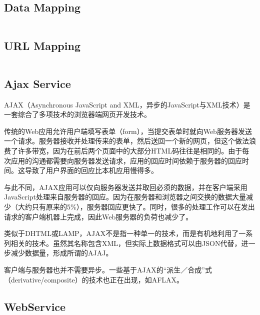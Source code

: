 \begin{lstlisting}[language=PHP]

\end{lstlisting}



\subsection{Data Mapping}


\begin{lstlisting}[language=PHP]

\end{lstlisting}



\subsection{URL Mapping}


\begin{lstlisting}[language=PHP]

\end{lstlisting}


\subsection{Ajax Service}


AJAX（Asynchronous JavaScript and XML，异步的JavaScript与XML技术）是一套综合了多项技术的浏览器端网页开发技术。

传统的Web应用允许用户端填写表单（form），当提交表单时就向Web服务器发送一个请求。服务器接收并处理传来的表单，然后送回一个新的网页，但这个做法浪费了许多带宽，因为在前后两个页面中的大部分HTML码往往是相同的。由于每次应用的沟通都需要向服务器发送请求，应用的回应时间依赖于服务器的回应时间。这导致了用户界面的回应比本机应用慢得多。

与此不同，AJAX应用可以仅向服务器发送并取回必须的数据，并在客户端采用JavaScript处理来自服务器的回应。因为在服务器和浏览器之间交换的数据大量减少（大约只有原来的5\%），服务器回应更快了。同时，很多的处理工作可以在发出请求的客户端机器上完成，因此Web服务器的负荷也减少了。

类似于DHTML或LAMP，AJAX不是指一种单一的技术，而是有机地利用了一系列相关的技术。虽然其名称包含XML，但实际上数据格式可以由JSON代替，进一步减少数据量，形成所谓的AJAJ。

客户端与服务器也并不需要异步。一些基于AJAX的“派生／合成”式（derivative/composite）的技术也正在出现，如AFLAX。


\subsection{WebService}

